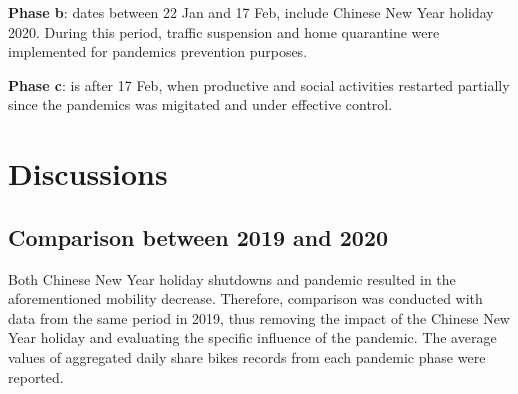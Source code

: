 \documentclass[preprints,article,accept,moreauthors,pdftex]{Definitions/mdpi}
\begin{document}
\textbf{Phase b}: dates between 22 Jan and 17 Feb, include Chinese New Year holiday 2020. During this period, traffic suspension and home quarantine were implemented for pandemics prevention purposes.

\textbf{Phase c}: is after 17 Feb, when productive and social activities restarted partially since the pandemics was migitated and under effective control.


\section{Discussions}
\subsection{Comparison between 2019 and 2020}%

Both Chinese New Year holiday shutdowns and pandemic resulted in the aforementioned mobility decrease.
Therefore, comparison was conducted with data from the same period in 2019, thus removing the impact of the Chinese New Year holiday and evaluating the specific influence of the pandemic.  
The average values of aggregated daily share bikes records from each pandemic phase were reported.
\end{document}
